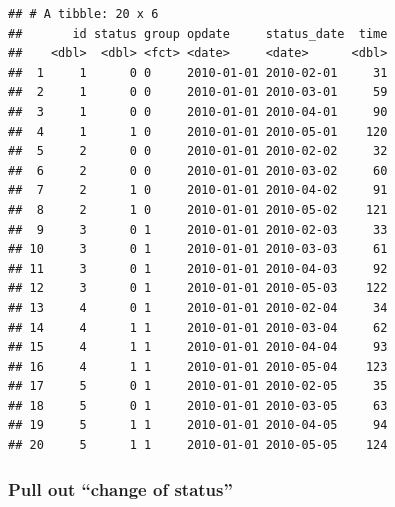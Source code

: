 \documentclass[]{book}
\newenvironment{Shaded}{\begin{snugshade}}{\end{snugshade}}
\newcommand{\CommentTok}[1]{\textcolor[rgb]{0.56,0.35,0.01}{\textit{#1}}}
\newcommand{\DataTypeTok}[1]{\textcolor[rgb]{0.13,0.29,0.53}{#1}}
\newcommand{\DecValTok}[1]{\textcolor[rgb]{0.00,0.00,0.81}{#1}}
\newcommand{\KeywordTok}[1]{\textcolor[rgb]{0.13,0.29,0.53}{\textbf{#1}}}
\newcommand{\NormalTok}[1]{#1}
\newcommand{\OperatorTok}[1]{\textcolor[rgb]{0.81,0.36,0.00}{\textbf{#1}}}
\newcommand{\OtherTok}[1]{\textcolor[rgb]{0.56,0.35,0.01}{#1}}
\newcommand{\StringTok}[1]{\textcolor[rgb]{0.31,0.60,0.02}{#1}}
\begin{document}
\begin{verbatim}
## # A tibble: 20 x 6
##       id status group opdate     status_date  time
##    <dbl>  <dbl> <fct> <date>     <date>      <dbl>
##  1     1      0 0     2010-01-01 2010-02-01     31
##  2     1      0 0     2010-01-01 2010-03-01     59
##  3     1      0 0     2010-01-01 2010-04-01     90
##  4     1      1 0     2010-01-01 2010-05-01    120
##  5     2      0 0     2010-01-01 2010-02-02     32
##  6     2      0 0     2010-01-01 2010-03-02     60
##  7     2      1 0     2010-01-01 2010-04-02     91
##  8     2      1 0     2010-01-01 2010-05-02    121
##  9     3      0 1     2010-01-01 2010-02-03     33
## 10     3      0 1     2010-01-01 2010-03-03     61
## 11     3      0 1     2010-01-01 2010-04-03     92
## 12     3      0 1     2010-01-01 2010-05-03    122
## 13     4      0 1     2010-01-01 2010-02-04     34
## 14     4      1 1     2010-01-01 2010-03-04     62
## 15     4      1 1     2010-01-01 2010-04-04     93
## 16     4      1 1     2010-01-01 2010-05-04    123
## 17     5      0 1     2010-01-01 2010-02-05     35
## 18     5      0 1     2010-01-01 2010-03-05     63
## 19     5      1 1     2010-01-01 2010-04-05     94
## 20     5      1 1     2010-01-01 2010-05-05    124
\end{verbatim}

\hypertarget{pull-out-change-of-status}{%
\subsubsection{Pull out ``change of status''}\label{pull-out-change-of-status}}

\begin{Shaded}
\end{Shaded}
\end{document}
